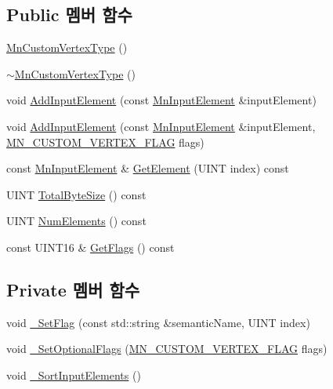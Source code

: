 \subsection*{Public 멤버 함수}
\begin{DoxyCompactItemize}
\item 
\hyperlink{class_m_n_l_1_1_mn_custom_vertex_type_afb415522e4178413b715a31c15fe3b8e}{Mn\+Custom\+Vertex\+Type} ()
\item 
\hyperlink{class_m_n_l_1_1_mn_custom_vertex_type_a31288f3a89ead83464697fafe098f9e2}{$\sim$\+Mn\+Custom\+Vertex\+Type} ()
\item 
void \hyperlink{class_m_n_l_1_1_mn_custom_vertex_type_add19b1562c7ce78121b1e7ef79f8a614}{Add\+Input\+Element} (const \hyperlink{class_m_n_l_1_1_mn_input_element}{Mn\+Input\+Element} \&input\+Element)
\item 
void \hyperlink{class_m_n_l_1_1_mn_custom_vertex_type_af8dca54222b2c1e264ea7c1ec9ae8a18}{Add\+Input\+Element} (const \hyperlink{class_m_n_l_1_1_mn_input_element}{Mn\+Input\+Element} \&input\+Element, \hyperlink{namespace_m_n_l_a37da403537a061d6aaa45b7d30f29ac2}{M\+N\+\_\+\+C\+U\+S\+T\+O\+M\+\_\+\+V\+E\+R\+T\+E\+X\+\_\+\+F\+L\+AG} flags)
\item 
const \hyperlink{class_m_n_l_1_1_mn_input_element}{Mn\+Input\+Element} \& \hyperlink{class_m_n_l_1_1_mn_custom_vertex_type_ac7f43f6d20d9bf260b1afddd990b6056}{Get\+Element} (U\+I\+NT index) const
\item 
U\+I\+NT \hyperlink{class_m_n_l_1_1_mn_custom_vertex_type_a92e41bee4facb51cdef610ddb4292cd2}{Total\+Byte\+Size} () const
\item 
U\+I\+NT \hyperlink{class_m_n_l_1_1_mn_custom_vertex_type_afa660f1f13f78bcea74ee1440ba124f3}{Num\+Elements} () const
\item 
const U\+I\+N\+T16 \& \hyperlink{class_m_n_l_1_1_mn_custom_vertex_type_a1dbc7a044aaa7f1077d8338b4f510a21}{Get\+Flags} () const
\end{DoxyCompactItemize}
\subsection*{Private 멤버 함수}
\begin{DoxyCompactItemize}
\item 
void \hyperlink{class_m_n_l_1_1_mn_custom_vertex_type_a946914659f5fa5fcb9c880842d562a8f}{\+\_\+\+Set\+Flag} (const std\+::string \&semantic\+Name, U\+I\+NT index)
\item 
void \hyperlink{class_m_n_l_1_1_mn_custom_vertex_type_a0bda476a6929af13f8142df51808b3ae}{\+\_\+\+Set\+Optional\+Flags} (\hyperlink{namespace_m_n_l_a37da403537a061d6aaa45b7d30f29ac2}{M\+N\+\_\+\+C\+U\+S\+T\+O\+M\+\_\+\+V\+E\+R\+T\+E\+X\+\_\+\+F\+L\+AG} flags)
\item 
void \hyperlink{class_m_n_l_1_1_mn_custom_vertex_type_af969b32418900badbe331bf4190af1ee}{\+\_\+\+Sort\+Input\+Elements} ()
\end{DoxyCompactItemize}
